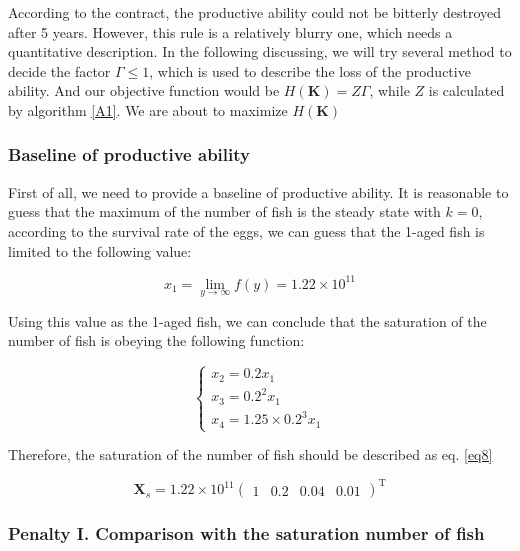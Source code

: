 \documentclass{IEEEtran}
\begin{document}
According to the contract, the productive ability could not be bitterly destroyed after 5 years. However, this rule is a relatively blurry one, which needs a quantitative description. In the following discussing, we will try several method to decide the factor $\Gamma \le 1$, which is used to describe the loss of the productive ability. And our objective function would be $H(\bm K) = Z\Gamma$, while $Z$ is calculated by algorithm \ref{A1}. We are about to maximize $H(\bm K)$

\subsubsection{Baseline of productive ability}

First of all, we need to provide a baseline of productive ability. It is reasonable to guess that the maximum of the number of fish is the steady state with $k = 0$, according to the survival rate of the eggs, we can guess that the 1-aged fish is limited to the following value:

\begin{equation}
    x_1 = \lim_{y\to\infty} f(y) = 1.22 \times 10^{11}
\end{equation}

Using this value as the 1-aged fish, we can conclude that the saturation of the number of fish is obeying the following function:

\begin{equation}
    \begin{cases}
        x_2 = 0.2 x_1\\
        x_3 = 0.2^2 x_1\\
        x_4 = 1.25 \times 0.2^3 x_1
    \end{cases}
\end{equation}

Therefore, the saturation of the number of fish should be described as eq. \ref{eq8}

\begin{equation}
    \label{eq8}
    \bm X_s = 1.22 \times 10^{11}\begin{pmatrix}1 & 0.2 & 0.04 & 0.01\end{pmatrix}^\mathrm T
\end{equation}

\subsubsection{Penalty I. Comparison with the saturation number of fish}
\end{document}
